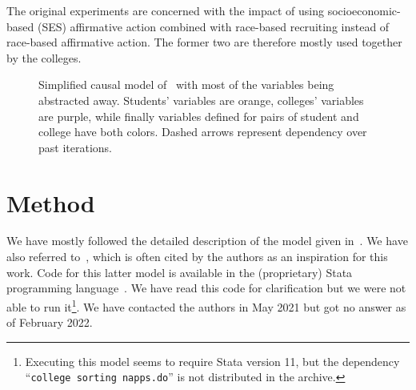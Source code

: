 The original experiments are concerned with the impact of using socioeconomic-based (SES) affirmative action combined with race-based recruiting instead of race-based affirmative action. The former two are therefore mostly used together by the colleges.

\begin{figure}
  \centering
  \caption{Simplified causal model of~\cite{reardon2018levels} with most of the variables being abstracted away. 
Students' variables are \colorbox{PuOr-K}{orange}, colleges' variables are \colorbox{PuOr-E}{purple}, while finally variables defined for pairs of student and college have both colors. 
Dashed arrows represent dependency over past iterations.}
  \label{fig:model}
\end{figure}

\section{Method}

We have mostly followed the detailed description of the model given in~\cite[Appendix~C]{reardon2018levels}. 
We have also referred to~\cite{reardon2016agent}, which is often cited by the authors as an inspiration for this work. 
Code for this latter model is available in the (proprietary) Stata programming language~\cite{reardon2016stata}.  
We have read this code for clarification but we were not able to run it\footnote{Executing this model seems to require Stata version 11, but the dependency ``\texttt{college sorting napps.do}'' is not distributed in the archive.}. 
We have contacted the authors in May 2021 but got no
answer as of February 2022.

